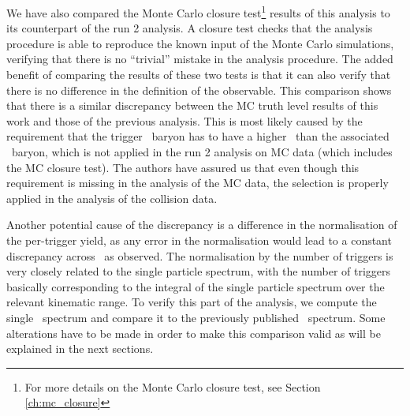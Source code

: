We have also compared the Monte Carlo closure test\footnote{For more details on the Monte Carlo closure test, see Section \ref{ch:mc_closure}} results of this analysis to its counterpart of the run 2 analysis.  A closure test checks that the analysis procedure is able to reproduce the known input of the Monte Carlo simulations, verifying that there is no ``trivial'' mistake in the analysis procedure.  The added benefit of comparing the results of these two tests is that it can also verify that there is no difference in the definition of the observable. This comparison shows that there is a similar discrepancy between the MC truth level results of this work and those of the previous analysis.  This is most likely caused by the requirement that the trigger \Xi\ baryon has to have a higher \pt\ than the associated \Xi\ baryon, which is not applied in the run 2 analysis on MC data (which includes the MC closure test). The authors have assured us that even though this requirement is missing in the analysis of the MC data, the selection is properly applied in the analysis of the collision data.

Another potential cause of the discrepancy is a difference in the normalisation of the per-trigger yield, as any error in the normalisation would lead to a constant discrepancy across \dphi\ as observed. The normalisation by the number of triggers is very closely related to the single particle spectrum, with the number of triggers basically corresponding to the integral of the single particle spectrum over the relevant kinematic range. To verify this part of the analysis, we compute the single \Xi\ spectrum and compare it to the previously published \Xi\ spectrum.\cite{Run2Spectra} Some alterations have to be made in order to make this comparison valid as will be explained in the next sections. 

